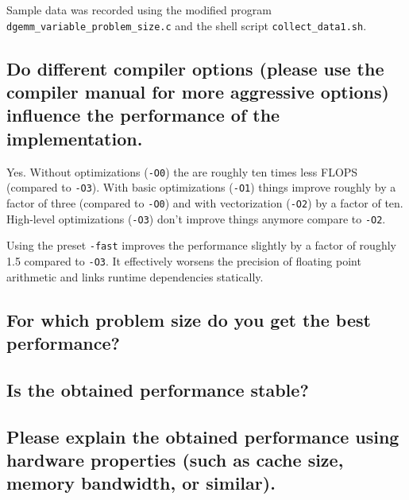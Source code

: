 \documentclass[11pt]{article}
\begin{document}
Sample data was recorded using the modified program \texttt{dgemm\_variable\_problem\_size.c} and the shell script \texttt{collect\_data1.sh}.

\subsection*{Do different compiler options (please use the compiler manual for more aggressive options) influence the performance of the implementation.}

Yes. Without optimizations (\texttt{-O0}) the are roughly ten times less FLOPS (compared to \texttt{-O3}). With basic optimizations (\texttt{-O1}) things improve roughly by a factor of three (compared to \texttt{-O0}) and with vectorization (\texttt{-O2}) by a factor of ten. High-level optimizations (\texttt{-O3}) don't improve things anymore compare to \texttt{-O2}.

Using the preset \texttt{-fast} improves the performance slightly by a factor of roughly 1.5 compared to \texttt{-O3}. It effectively worsens the precision of floating point arithmetic and links runtime dependencies statically.

\subsection*{For which problem size do you get the best performance?}

\subsection*{Is the obtained performance stable?}

\subsection*{Please explain the obtained performance using hardware properties (such as cache size, memory bandwidth, or similar).}
\end{document}

